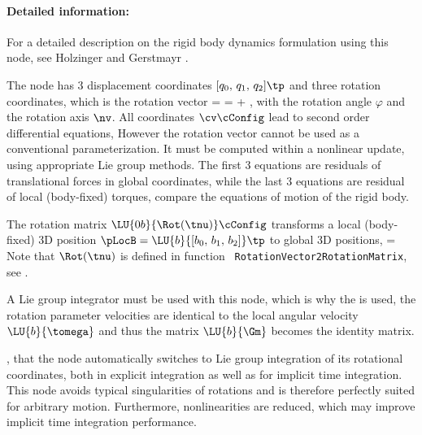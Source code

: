     \paragraph{Detailed information:}
    For a detailed description on the rigid body dynamics formulation using this node, 
    see Holzinger and Gerstmayr \cite{HolzingerGerstmayr2020}.

    The node has 3 displacement coordinates $[q_0,\,q_1,\,q_2]\tp$ and three rotation coordinates, which is the rotation vector 
    \be
      \tnu = \varphi \nv = \tnu\cConfig + \tnu\cRef,
    \ee
    with the rotation angle $\varphi$ and the rotation axis $\nv$.
    All coordinates $\cv\cConfig$ lead to second order differential equations, 
    However the rotation vector cannot be used as a conventional parameterization. 
    It must be computed within a nonlinear update, using appropriate Lie group methods.
    The first 3 equations are residuals of translational forces in global coordinates,
    while the last 3 equations are residual of local (body-fixed) torques, 
    compare the equations of motion of the rigid body.

    The rotation matrix $\LU{0b}{\Rot(\tnu)}\cConfig$ transforms a local (body-fixed) 3D position 
    $\pLocB = \LU{b}{[b_0,\,b_1,\,b_2]}\tp$ to global 3D positions,
    \be
      \cConfig = \cConfig {} 
    \ee
    Note that $\Rot(\tnu)$ is defined in function \texttt{ RotationVector2RotationMatrix}, see .
    
    A Lie group integrator must be used with this node, which is why the is used, the 
    rotation parameter velocities are identical to the local angular velocity $\LU{b}{\tomega}$ and thus the 
    matrix $ \LU{b}{\Gm}$ becomes the identity matrix.
    
    , that the node automatically switches to Lie group integration of its
    rotational coordinates, both in explicit integration as well as for implicit time integration.
    This node avoids typical singularities of rotations and is therefore perfectly suited
    for arbitrary motion. Furthermore, nonlinearities are reduced, which may improve
    implicit time integration performance.
    
